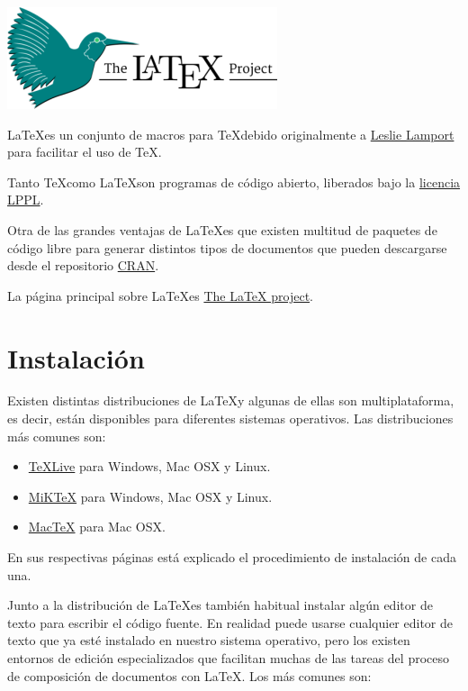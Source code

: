 \documentclass[
  a4paper,
]{scrreport}
\providecommand{\tightlist}{%
  \setlength{\itemsep}{0pt}\setlength{\parskip}{0pt}}\usepackage{longtable,booktabs,array}
\theoremstyle{definition}
\theoremstyle{remark}
\begin{document}
\includegraphics{img/logos/latex-project-logo.png}

\LaTeX es un conjunto de macros para \TeX debido originalmente a
\href{https://en.wikipedia.org/wiki/Leslie_Lamport}{Leslie Lamport} para
facilitar el uso de \TeX.

Tanto \TeX como \LaTeX son programas de código abierto, liberados bajo
la \href{https://www.latex-project.org/lppl.txt}{licencia LPPL}.

Otra de las grandes ventajas de \LaTeX es que existen multitud de
paquetes de código libre para generar distintos tipos de documentos que
pueden descargarse desde el repositorio \href{https://ctan.org/}{CRAN}.

La página principal sobre \LaTeX es
\href{https://www.latex-project.org/}{The LaTeX project}.

\section{Instalación}\label{instalaciuxf3n}

Existen distintas distribuciones de \LaTeX y algunas de ellas son
multiplataforma, es decir, están disponibles para diferentes sistemas
operativos. Las distribuciones más comunes son:

\begin{itemize}
\tightlist
\item
  \href{https://tug.org/texlive/}{TeXLive} para Windows, Mac OSX y
  Linux.
\item
  \href{}{MiKTeX} para Windows, Mac OSX y Linux.
\item
  \href{https://www.tug.org/mactex/}{MacTeX} para Mac OSX.
\end{itemize}

En sus respectivas páginas está explicado el procedimiento de
instalación de cada una.

Junto a la distribución de \LaTeX es también habitual instalar algún
editor de texto para escribir el código fuente. En realidad puede usarse
cualquier editor de texto que ya esté instalado en nuestro sistema
operativo, pero los existen entornos de edición especializados que
facilitan muchas de las tareas del proceso de composición de documentos
con \LaTeX. Los más comunes son:
\end{document}
